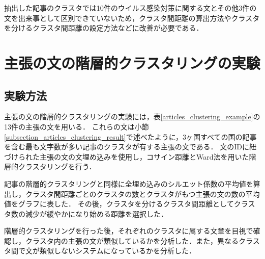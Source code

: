 \documentclass[12pt,a4j,dvipdfmx]{jreport}
\begin{document}
抽出した記事のクラスタでは10件のウイルス感染対策に関する文とその他3件の文を出来事として区別できていないため，クラスタ間距離の算出方法やクラスタを分けるクラスタ間距離の設定方法などに改善が必要である．

\section{主張の文の階層的クラスタリングの実験}
\label{section_sentence_clustering_experiment}

\subsection{実験方法}

主張の文の階層的クラスタリングの実験には，表\ref{articles_clustering_example}の13件の主張の文を用いる．
これらの文は小節\ref{subsection_articles_clustering_result}で述べたように，3ヶ国すべての国の記事を含む最も文字数が多い記事のクラスタが有する主張の文である．
文のIDに紐づけられた主張の文の文埋め込みを使用し，コサイン距離とWard法を用いた階層的クラスタリングを行う．



記事の階層的クラスタリングと同様に全埋め込みのシルエット係数の平均値を算出し，クラスタ間距離ごとのクラスタの数とクラスタがもつ主張の文の数の平均値をグラフに表した．
その後，クラスタを分けるクラスタ間距離としてクラスタ数の減少が緩やかになり始める距離を選択した．

階層的クラスタリングを行った後，それぞれのクラスタに属する文章を目視で確認し，クラスタ内の主張の文が類似しているかを分析した．また，異なるクラスタ間で文が類似しないシステムになっているかを分析した．
\end{document}
